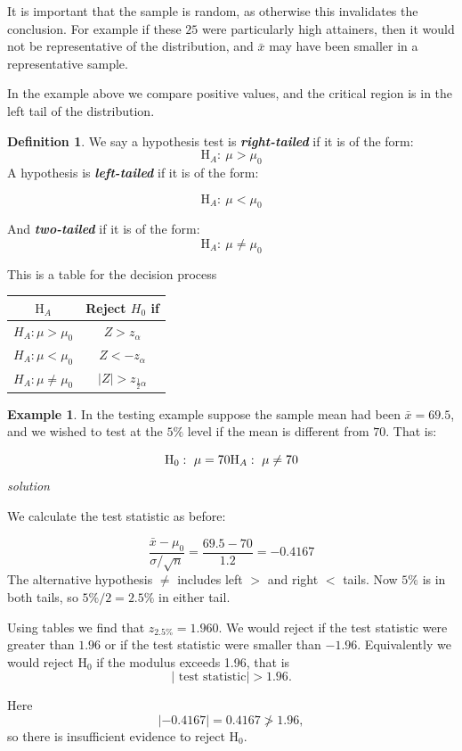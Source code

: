 \documentclass[
]{book}
\theoremstyle{definition}
\newtheorem{definition}{Definition}[chapter]
\theoremstyle{definition}
\newtheorem{example}{Example}[chapter]
\theoremstyle{definition}
\theoremstyle{definition}
\theoremstyle{remark}
\begin{document}
It is important that the sample is random, as otherwise this invalidates the conclusion. For example if these \(25\) were particularly high attainers, then it would not be representative of the distribution, and \(\bar{x}\) may have been smaller in a representative sample.

In the example above we compare positive values, and the critical region is in the left tail of the distribution.

\begin{definition}
We say a hypothesis test is \textbf{\emph{right-tailed}} if it is of the form:
\[\text{H}_A: \ \mu > \mu_0\]
A hypothesis is \textbf{\emph{left-tailed}} if it is of the form:

\[\text{H}_A: \ \mu < \mu_0\]

And \textbf{\emph{two-tailed}} if it is of the form:
\[\text{H}_A: \ \mu \neq \mu_0\]
\end{definition}

This is a table for the decision process

\begin{longtable}[]{@{}cc@{}}
\toprule
\(\text{H}_{A}\) & Reject \(H_{0}\) if\tabularnewline
\midrule
\endhead
\(H_{A}: \mu > \mu_0\) & \(Z>z_{\alpha}\)\tabularnewline
\(H_{A}: \mu < \mu_0\) & \(Z<-z_{\alpha}\)\tabularnewline
\(H_{A}: \mu \neq \mu_0\) & \(|Z|>z_{\frac{1}{2}\alpha}\)\tabularnewline
\bottomrule
\end{longtable}

\begin{example}
In the testing example suppose the sample mean had been \(\bar{x}=69.5\), and we wished to test at the \(5\%\) level if the mean is different from \(70\). That is:

\[\text{H}_0: \ \mu = 70 \\  \text{H}_A: \ \mu \neq 70\]
\emph{solution}

We calculate the test statistic as before:

\[\frac{\bar{x}-\mu_0}{\sigma / \sqrt{n}} =\frac{69.5-70}{1.2}=-0.4167  \]
The alternative hypothesis \(\neq\) includes left \(>\) and right \(<\) tails. Now \(5\%\) is in both tails, so \(5\% / 2 =2.5\%\) in either tail.

Using tables we find that \(z_{2.5\%} = 1.960\). We would reject if the test statistic were greater than \(1.96\) or if the test statistic were smaller than \(-1.96\). Equivalently we would reject \(\text{H}_0\) if the modulus exceeds 1.96, that is \[|\text{ test statistic}|>1.96.\]

Here
\[|-0.4167| = 0.4167 \ngtr 1.96,\]
so there is insufficient evidence to reject \(\text{H}_0\).
\end{example}
\end{document}
